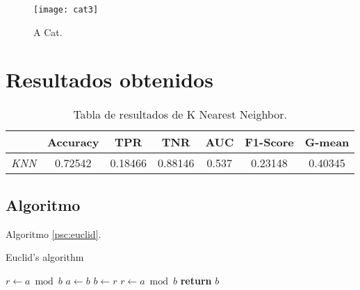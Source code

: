 \documentclass[12pt]{article} %
\begin{document}
\begin{figure}[H]
  \centering
  \texttt{[image: cat3]}
  \caption{A Cat.}
  \label{fig:cat3}
  \vspace{-20pt}
\end{figure}

\lipsum[10]


\section{Resultados obtenidos}

\lipsum[11]

\begin{table}[H]
  \centering
  \begin{tabular}{l | c | c | c | c | c | c}
    & \textbf{Accuracy} & \textbf{TPR} & \textbf{TNR} & \textbf{AUC} & \textbf{F1-Score} & \textbf{G-mean} \\ \hline
    \textit{KNN} & 0.72542 & 0.18466 & 0.88146 & 0.537 & 0.23148 & 0.40345 \\
  \end{tabular}
  \caption{Tabla de resultados de K Nearest Neighbor.}\label{tab:meas-knn}
  \vspace{-20pt}
\end{table}

\lipsum[12]

\subsection{Algoritmo}

\lipsum[13-14]

Algoritmo \ref{psc:euclid}.

\begin{algorithm}[H]
  \caption{Euclid’s algorithm}\label{psc:euclid}
  \begin{algorithmic}[1]
    \State $r\gets a\bmod b$
    \State $a\gets b$
    \State $b\gets r$
    \State $r\gets a\bmod b$
    \EndWhile\label{euclidendwhile}
    \State \textbf{return} $b$
  \EndProcedure
  \end{algorithmic}
\end{algorithm}

\lipsum[14]


\newpage

\end{document}
